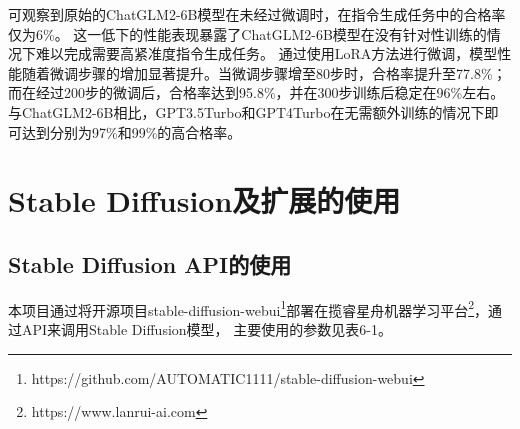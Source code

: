 \documentclass[a4paper,AutoFakeBold,oneside,12pt]{book}
\begin{document}


可观察到原始的ChatGLM2-6B模型在未经过微调时，在指令生成任务中的合格率仅为6\%。
这一低下的性能表现暴露了ChatGLM2-6B模型在没有针对性训练的情况下难以完成需要高紧准度指令生成任务。
通过使用LoRA方法进行微调，模型性能随着微调步骤的增加显著提升。当微调步骤增至80步时，合格率提升至77.8\%；
而在经过200步的微调后，合格率达到95.8\%，并在300步训练后稳定在96\%左右。
与ChatGLM2-6B相比，GPT3.5Turbo和GPT4Turbo在无需额外训练的情况下即可达到分别为97\%和99\%的高合格率。

\chapter{Stable Diffusion及扩展的使用} %
\section{Stable Diffusion API的使用}
本项目通过将开源项目stable-diffusion-webui\footnote{https://github.com/AUTOMATIC1111/stable-diffusion-webui}部署在揽睿星舟机器学习平台\footnote{https://www.lanrui-ai.com}，通过API来调用Stable Diffusion模型，
主要使用的参数见表6-1。
\end{document}
